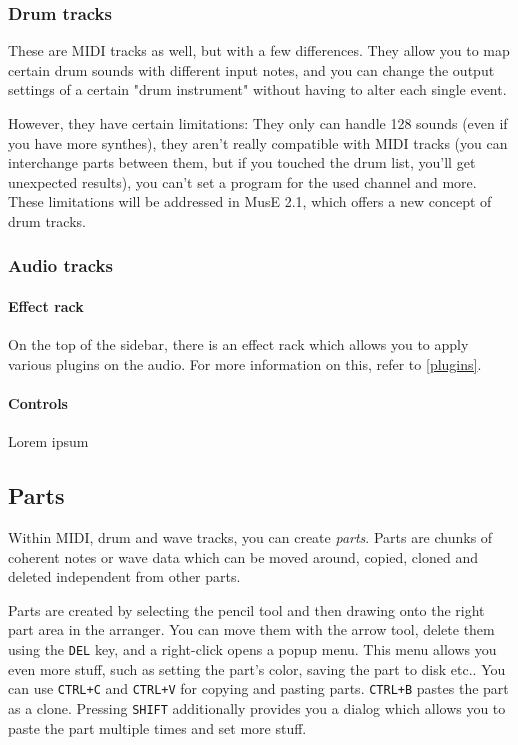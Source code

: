 \documentclass[a4paper]{report}
\begin{document}
\subsubsection{Drum tracks}
These are MIDI tracks as well, but with a few differences. They allow
you to map certain drum sounds with different input notes, and you
can change the output settings of a certain "drum instrument" without
having to alter each single event.

However, they have certain limitations: They only can handle 128 sounds
(even if you have more synthes), they aren't really compatible with
MIDI tracks (you can interchange parts between them, but if you touched
the drum list, you'll get unexpected results), you can't set a program
for the used channel and more. These limitations will be addressed in
MusE 2.1, which offers a new concept of drum tracks.

\subsubsection{Audio tracks}
\paragraph{Effect rack}
On the top of the sidebar, there is an effect rack which allows you to
apply various plugins on the audio. For more information on this, refer
to \ref{plugins}.

\paragraph{Controls}
Lorem ipsum %


\subsection{Parts}
Within MIDI, drum and wave tracks, you can create \emph{parts}. Parts
are chunks of coherent notes or wave data which can be moved around,
copied, cloned and deleted independent from other parts.

Parts are created by selecting the pencil tool and then drawing onto
the right part area in the arranger. You can move them with the arrow
tool, delete them using the \texttt{DEL} key, and a right-click opens
a popup menu. This menu allows you even more stuff, such as setting
the part's color, saving the part to disk etc.. You can use
\texttt{CTRL+C} and \texttt{CTRL+V} for copying and pasting parts.
\texttt{CTRL+B} pastes the part as a clone. Pressing \texttt{SHIFT}
additionally provides you a dialog which allows you to paste the part
multiple times and set more stuff.
\end{document}

